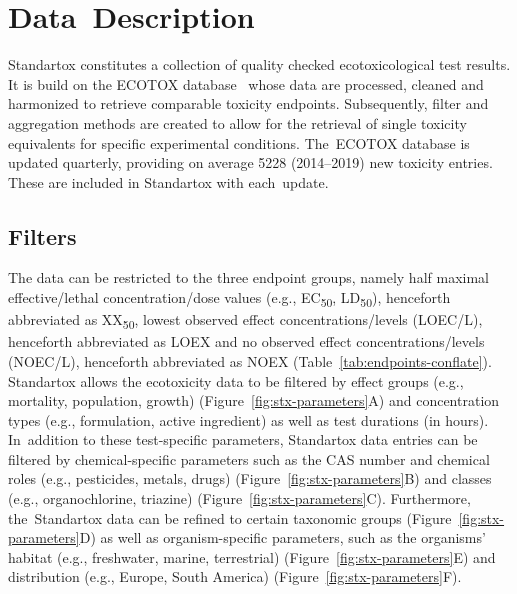 \documentclass[data,datadescriptor,accept,moreauthors,pdftex]{Definitions/mdpi}
\begin{document}
\section{Data~Description}
Standartox constitutes a collection of quality checked ecotoxicological test results. It is build on the ECOTOX database~\citep{usepa_ecotox_2019} whose data are processed, cleaned and harmonized to retrieve comparable toxicity endpoints. Subsequently, filter and aggregation methods are created to allow for the retrieval of single toxicity equivalents for specific experimental conditions. The~ECOTOX database is updated quarterly, providing on average 5228 (2014--2019) new toxicity entries. These are included in Standartox with each~update.

\subsection{Filters}
The data can be restricted to the three endpoint groups, namely half maximal effective/lethal concentration/dose values (e.g., EC\textsubscript{50}, LD\textsubscript{50}), henceforth abbreviated as XX\textsubscript{50}, lowest observed effect concentrations/levels (LOEC/L), henceforth abbreviated as LOEX and no observed effect concentrations/levels (NOEC/L), henceforth abbreviated as NOEX (Table~\ref{tab:endpoints-conflate}). Standartox allows the ecotoxicity data to be filtered by effect groups (e.g., mortality, population, growth) (Figure~\ref{fig:stx-parameters}A) and concentration types (e.g., formulation, active ingredient) as well as test durations (in hours). In~addition to these test-specific parameters, Standartox data entries can be filtered by chemical-specific parameters such as the CAS number and chemical roles (e.g., pesticides, metals, drugs) (Figure~\ref{fig:stx-parameters}B) and classes (e.g., organochlorine, triazine) (Figure~\ref{fig:stx-parameters}C). Furthermore, the~Standartox data can be refined to certain taxonomic groups (Figure~\ref{fig:stx-parameters}D) as well as organism-specific parameters, such as the organisms' habitat (e.g., freshwater, marine, terrestrial) (Figure~\ref{fig:stx-parameters}E) and distribution (e.g., Europe, South America) (Figure~\ref{fig:stx-parameters}F).
\end{document}
